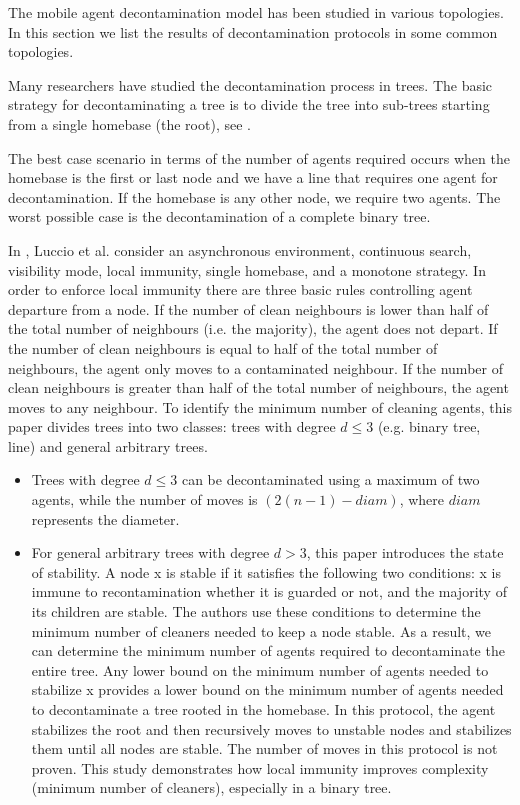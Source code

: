 The mobile agent decontamination model has been studied in various topologies. In this section we list the results of decontamination protocols in some common topologies.

 
Many researchers have studied the decontamination process in trees. The basic strategy for decontaminating a tree is to divide the tree into sub-trees starting from a single homebase (the root), see \cite{floetal13,lucetal22}. 

The best case scenario in terms of the number of agents required occurs when the homebase is the first or last node and we have a line that requires one agent for decontamination. If the homebase is any other node, we require two agents. The worst possible case is the decontamination of a complete binary tree.


In \cite{lucetal22}, Luccio et al. consider an asynchronous environment, continuous search, visibility mode, local immunity, single homebase, and a monotone strategy. In order to enforce local immunity there are three basic rules controlling agent departure from a node. If the number of clean neighbours is lower than half of the total number of neighbours (i.e. the majority), the agent does not depart. If the number of clean neighbours is equal to half of the total number of neighbours, the agent only moves to a contaminated neighbour. If the number of clean neighbours is greater than half of the total number of neighbours, the agent moves to any neighbour.
To identify the minimum number of cleaning agents, this paper divides trees into two classes: trees with degree $d \leq 3$ (e.g. binary tree, line) and general arbitrary trees.
\begin{itemize}

\item Trees with degree $d \leq 3$ can be decontaminated using a maximum of two agents,
while the number of moves is $(2(n-1) - diam)$, where $diam$ represents the diameter. 
\item For general arbitrary trees with degree $d >3$, this paper introduces the state of stability. A node x is stable if it satisfies the following two conditions: x is immune to recontamination whether it is guarded or not, and the majority of its children are stable. 
The authors use these conditions to determine the minimum number of cleaners needed to keep a node stable. As a result, we can determine the minimum number of agents required to decontaminate the entire tree. Any lower bound on the minimum number of agents needed to stabilize x provides a lower bound on the minimum number of agents needed to decontaminate a tree rooted in the homebase. In this protocol, the agent stabilizes the root and then recursively moves to unstable nodes and stabilizes them until all nodes are stable. The number of moves in this protocol is not proven. This study demonstrates how local immunity improves complexity (minimum number of cleaners), especially in a binary tree.
 \end{itemize}

